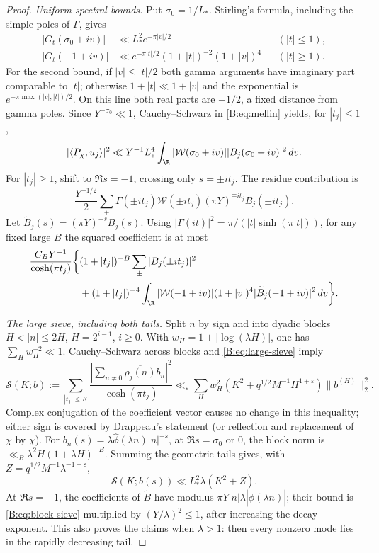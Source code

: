 \begin{proof}
\emph{Uniform spectral bounds.}
Put \(\sigma_0=1/L_*\). Stirling's formula, including the simple poles
of \(\Gamma\), gives
\begin{align*}
 |G_t(\sigma_0+iv)|&\ll L_*^2e^{-\pi|v|/2} &&(|t|\le1),\\
 |G_t(-1+iv)|&\ll e^{-\pi|t|/2}(1+|t|)^{-2}(1+|v|)^4
                                      &&(|t|\ge1).
\end{align*}
For the second bound, if \(|v|\le|t|/2\) both gamma arguments have
imaginary part comparable to \(|t|\); otherwise
\(1+|t|\ll1+|v|\) and the exponential is
\(e^{-\pi\max(|v|,|t|)/2}\). On this line both real parts are \(-1/2\),
a fixed distance from gamma poles. Since \(Y^{-\sigma_0}\ll1\),
Cauchy--Schwarz in \eqref{B:eq:mellin} yields, for \(|t_j|\le1\),
\[
 |\langle P_\chi,u_j\rangle|^2
 \ll Y^{-1}L_*^4\int_\R |\mathcal W(\sigma_0+iv)|
                                    |B_j(\sigma_0+iv)|^2\,dv.
\]
For \(|t_j|\ge1\), shift to \(\Re s=-1\), crossing only \(s=\pm it_j\).
The residue contribution is
\[
 \frac{Y^{-1/2}}2\sum_\pm
       \Gamma(\pm it_j)\mathcal W(\pm it_j)(\pi Y)^{\mp it_j}B_j(\pm it_j).
\]
Let \(\widetilde B_j(s)=(\pi Y)^{-s}B_j(s)\).
Using \(|\Gamma(it)|^2=\pi/(|t|\sinh(\pi|t|))\), for any fixed large
\(B\) the squared coefficient is at most
\begin{align}\label{B:eq:high-t}
 \frac{C_BY^{-1}}{\cosh(\pi t_j)}\bigg\{&
 (1+|t_j|)^{-B}\sum_\pm|B_j(\pm it_j)|^2\notag\\
 &+(1+|t_j|)^{-4}\int_\R
  |\mathcal W(-1+iv)|(1+|v|)^4|\widetilde B_j(-1+iv)|^2\,dv\bigg\}.
\end{align}

\emph{The large sieve, including both tails.}
Split \(n\) by sign and into dyadic blocks \(H<|n|\le2H\),
\(H=2^{i-1}\), \(i\ge0\). With
\(w_H=1+|\log(\lambda H)|\), one has \(\sum_Hw_H^{-2}\ll1\).
Cauchy--Schwarz across blocks and \eqref{B:eq:large-sieve} imply
\[
 \mathcal S(K;b):=\sum_{|t_j|\le K}\frac{|\sum_{n\ne0}\overline{\rho_j(n)}b_n|^2}
                                             {\cosh(\pi t_j)}
 \ll_\varepsilon\sum_H w_H^2
       (K^2+q^{1/2}M^{-1}H^{1+\varepsilon})\|b^{(H)}\|_2^2.
\]
Complex conjugation of the coefficient vector causes no change in this
inequality; either sign is covered by Drappeau's statement (or reflection
and replacement of \(\chi\) by \(\bar\chi\)). For
\(b_n(s)=\lambda\widehat\phi(\lambda n)|n|^{-s}\), at
\(\Re s=\sigma_0\) or \(0\), the block norm is
\(\ll_B\lambda^2H(1+\lambda H)^{-B}\).
Summing the geometric tails gives, with
\(Z=q^{1/2}M^{-1}\lambda^{-1-\varepsilon}\),
\begin{equation}\label{B:eq:block-sieve}
 \mathcal S(K;b(s))\ll L_*^2\lambda(K^2+Z).
\end{equation}
At \(\Re s=-1\), the coefficients of \(\widetilde B\) have modulus
\(\pi Y|n|\lambda|\widehat\phi(\lambda n)|\); their bound is
\eqref{B:eq:block-sieve} multiplied by \((Y/\lambda)^2\le1\), after
increasing the decay exponent. This also proves the claims when
\(\lambda>1\): then every nonzero mode lies in the rapidly decreasing tail.


\end{proof}
